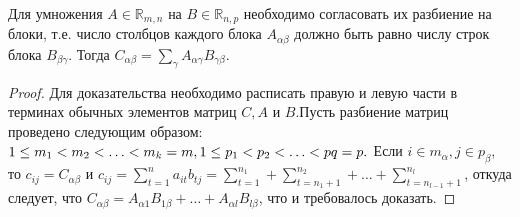   Для умножения $A \in \mathds{R}_{m,n}$ на $B \in \mathds{R}_{n,p}$ необходимо согласовать их разбиение на блоки, т.е. число столбцов каждого блока $A_{\alpha \beta}$ должно быть равно числу строк блока $B_{\beta \gamma}$. Тогда $C_{\alpha \beta} = \sum \limits_{\gamma} A_{\alpha \gamma} B_{\gamma \beta}$.
  \begin{proof}
Для доказательства необходимо расписать правую и левую части в терминах обычных элементов матриц $C,A$ и $B$.Пусть разбиение матриц проведено следующим образом:
  $1 \leq m_{1} < m_{2} < \dotso < m_{k} = m, 1 \leq p_{1} < p_{2} < \dotso < p{q} = p.\\$
  Если $i \in m_{\alpha}, j \in p_{\beta}$, то $c_{ij}=C_{\alpha \beta}$ и $c_{ij}=\sum \limits_{t=1}^n a_{it}b_{tj} = \sum \limits_{t=1}^{n_{1}} + \sum \limits_{t=n_{1}+1}^{n_{2}} + \dotso + \sum \limits_{t=n_{l-1}+1}^{n_{l}}$, откуда следует, что $ C_{\alpha \beta} = A_{\alpha 1}B_{1 \beta} + \dotso + A_{\alpha l}B_{l \beta}$, что и требовалось доказать.
\end{proof}
